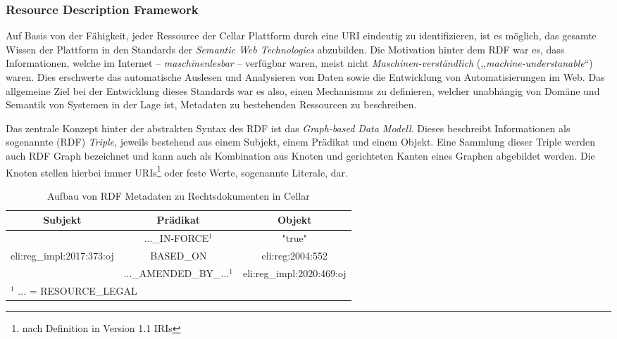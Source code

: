 \subsubsection{Resource Description Framework}

Auf Basis von der Fähigkeit, jeder Ressource der Cellar Plattform durch eine \ac{URI} eindeutig zu identifizieren, ist es möglich, das gesamte Wissen der Plattform in den Standards der \textit{Semantic Web Technologies} abzubilden.
Die Motivation hinter dem \acf{RDF} war es, dass Informationen, welche im Internet -- \textit{maschinenlesbar} -- verfügbar waren, meist nicht \textit{Maschinen-verständlich} (,,\textit{machine-understanable}``) waren.
Dies erschwerte das automatische Auslesen und Analysieren von Daten sowie die Entwicklung von Automatisierungen im Web.
Das allgemeine Ziel bei der Entwicklung dieses Standards war es also, einen Mechanismus zu definieren, welcher unabhängig von Domäne und Semantik von Systemen in der Lage ist, Metadaten zu bestehenden Ressourcen zu beschreiben. \cite[Abs. 1]{eu_rdf_w3c} 

Das zentrale Konzept hinter der abstrakten Syntax des \ac{RDF} ist das \textit{Graph-based Data Modell}.
Dieses beschreibt Informationen als sogenannte (\ac{RDF}) \textit{Triple}, jeweils bestehend aus einem Subjekt, einem Prädikat und einem Objekt. 
Eine Sammlung dieser Triple werden auch \ac{RDF} Graph bezeichnet und kann auch als Kombination aus Knoten und gerichteten Kanten eines Graphen abgebildet werden.
Die Knoten stellen hierbei immer \acp{URI}\footnote{nach Definition in Version 1.1 \acp{IRI}} oder feste Werte, sogenannte Literale, dar.
\cite[Abs. 1.1]{eu_rdf_concepts}



\begin{table}[h]
    \centering
    \begin{tabular}{|c|c|c|} \hline
         Subjekt&  Prädikat& Objekt\\ \hline\hline
         &  ...\_IN-FORCE$^1$& "true"\\ \cline{2-3}
         eli:reg\_impl:2017:373:oj&  BASED\_ON& eli:reg:2004:552\\ \cline{2-3} 
         &  ...\_AMENDED\_BY\_...$^1$& eli:reg\_impl:2020:469:oj\\ \hline
 \multicolumn{3}{l}{$^1$ ... = RESOURCE\_LEGAL}\\
    \end{tabular}
    \caption{Aufbau von RDF Metadaten zu Rechtsdokumenten in Cellar}
    \label{tab:rdf_example}
\end{table}




